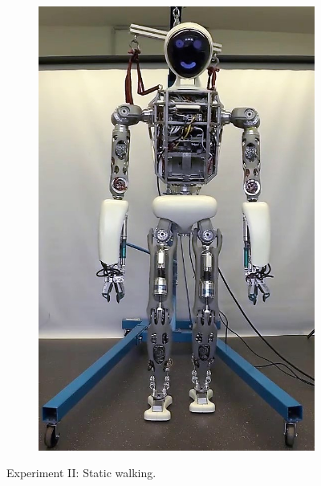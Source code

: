 \begin{figure}[h!]
\begin{subfigure}{.2\textwidth}
	\includegraphics[width=.95\linewidth]{experiments/walkStatic/snaps/5}
	\end{subfigure}%
\caption{Experiment II: Static walking.}
\label{exp:staticWalkingSnaps}
\end{figure} 

